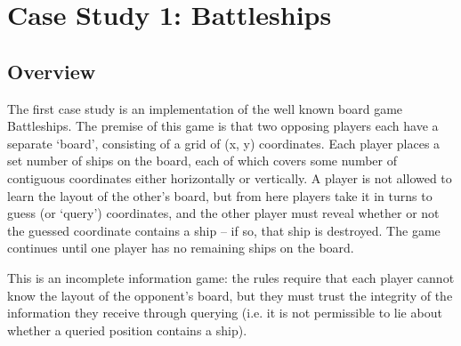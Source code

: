 \section{Case Study 1: Battleships} \label{sect_cs_battleships}

%
%
%
%
%
%
%
%
%
%
%
%
%
%

\subsection{Overview}

The first case study is an implementation of the well known board game Battleships. The premise of this game is that two opposing players each have a separate `board', consisting of a grid of (x, y) coordinates. Each player places a set number of ships on the board, each of which covers some number of contiguous coordinates either horizontally or vertically. A player is not allowed to learn the layout of the other's board, but from here players take it in turns to guess (or `query') coordinates, and the other player must reveal whether or not the guessed coordinate contains a ship -- if so, that ship is destroyed. The game continues until one player has no remaining ships on the board.

This is an incomplete information game: the rules require that each player cannot know the layout of the opponent's board, but they must trust the integrity of the information they receive through querying (i.e. it is not permissible to lie about whether a queried position contains a ship).

